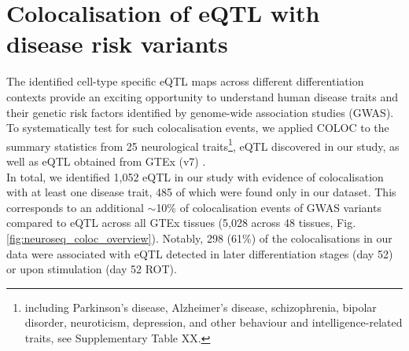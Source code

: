 




\clearpage

\section{Colocalisation of eQTL with disease risk variants}
\label{sec:neuroseq_coloc}

The identified cell-type specific eQTL maps across different differentiation contexts provide an exciting opportunity to understand human disease traits and their genetic risk factors identified by genome-wide association studies (GWAS). 
To systematically test for such colocalisation events, we applied COLOC \cite{giambartolomei2014bayesian} to the summary statistics from 25 neurological traits\footnote{including Parkinson's disease, Alzheimer's disease, schizophrenia, bipolar disorder, neuroticism, depression, and other behaviour and intelligence-related traits, see Supplementary Table XX.}, eQTL discovered in our study, as well as eQTL obtained from GTEx (v7) \cite{gtex2017genetic}.\\

In total, we identified 1,052 eQTL in our study with evidence of colocalisation with at least one disease trait, 485 of which were found only in our dataset. 
This corresponds to an additional $\sim$10\% of colocalisation events of GWAS variants compared to eQTL across all GTEx tissues (5,028 across 48 tissues, Fig. \ref{fig:neuroseq_coloc_overview}). 
Notably, 298 (61\%) of the colocalisations in our data were associated with eQTL detected in later differentiation stages (day 52) or upon stimulation (day 52 ROT).\\

